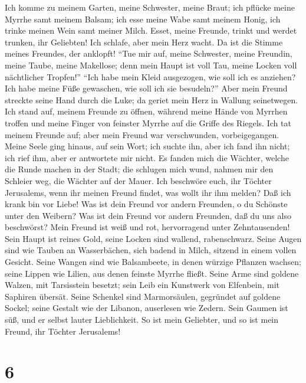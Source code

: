  Ich komme zu meinem Garten, meine Schwester, meine Braut;
ich pflücke meine Myrrhe samt meinem Balsam; ich esse meine Wabe samt
meinem Honig, ich trinke meinen Wein samt meiner Milch. Esset, meine
Freunde, trinkt und werdet trunken, ihr Geliebten!  Ich
schlafe, aber mein Herz wacht. Da ist die Stimme meines Freundes, der
anklopft! ``Tue mir auf, meine Schwester, meine Freundin, meine Taube,
meine Makellose; denn mein Haupt ist voll Tau, meine Locken voll
nächtlicher Tropfen!''  ``Ich habe mein Kleid ausgezogen,
wie soll ich es anziehen? Ich habe meine Füße gewaschen, wie soll ich
sie besudeln?''  Aber mein Freund streckte seine Hand
durch die Luke; da geriet mein Herz in Wallung seinetwegen.
 Ich stand auf, meinem Freunde zu öffnen, während meine
Hände von Myrrhen troffen und meine Finger von feinster Myrrhe auf die
Griffe des Riegels.  Ich tat meinem Freunde auf; aber mein
Freund war verschwunden, vorbeigegangen. Meine Seele ging hinaus, auf
sein Wort; ich suchte ihn, aber ich fand ihn nicht; ich rief ihm, aber
er antwortete mir nicht.  Es fanden mich die Wächter,
welche die Runde machen in der Stadt; die schlugen mich wund, nahmen mir
den Schleier weg, die Wächter auf der Mauer.  Ich
beschwöre euch, ihr Töchter Jerusalems, wenn ihr meinen Freund findet,
was wollt ihr ihm melden? Daß ich krank bin vor Liebe! 
Was ist dein Freund vor andern Freunden, o du Schönste unter den
Weibern? Was ist dein Freund vor andern Freunden, daß du uns also
beschwörst?  Mein Freund ist weiß und rot, hervorragend
unter Zehntausenden!  Sein Haupt ist reines Gold, seine
Locken sind wallend, rabenschwarz.  Seine Augen sind wie
Tauben an Wasserbächen, sich badend in Milch, sitzend in einem vollen
Gesicht.  Seine Wangen sind wie Balsambeete, in denen
würzige Pflanzen wachsen; seine Lippen wie Lilien, aus denen feinste
Myrrhe fließt.  Seine Arme sind goldene Walzen, mit
Tarsisstein besetzt; sein Leib ein Kunstwerk von Elfenbein, mit Saphiren
übersät.  Seine Schenkel sind Marmorsäulen, gegründet auf
goldene Sockel; seine Gestalt wie der Libanon, auserlesen wie Zedern.
 Sein Gaumen ist süß, und er selbst lauter Lieblichkeit.
So ist mein Geliebter, und so ist mein Freund, ihr Töchter Jerusalems!

\hypertarget{section-5}{%
\section{6}\label{section-5}}

